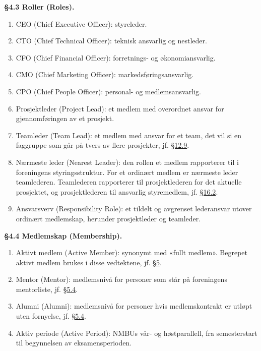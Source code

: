 \documentclass{../../../Common/Latex/Templates/rapport}
\begin{document}
\textbf{\S 4.3 Roller (Roles).}\label{bylaw:4.3}
\begin{enumerate}
  \item CEO (Chief Executive Officer): styreleder.
  \item CTO (Chief Technical Officer): teknisk ansvarlig og nestleder.
  \item CFO (Chief Financial Officer): forretnings- og økonomiansvarlig.
  \item CMO (Chief Marketing Officer): markedsføringsansvarlig.
  \item CPO (Chief People Officer): personal- og medlemsansvarlig.
  \item Prosjektleder (Project Lead): et medlem med overordnet ansvar for gjennomføringen av et prosjekt.
  \item Teamleder (Team Lead): et medlem med ansvar for et team, det vil si en faggruppe som går på tvers av flere prosjekter, jf. \hyperref[bylaw:12.9]{\S 12.9}.
  \item Nærmeste leder (Nearest Leader): den rollen et medlem rapporterer til i foreningens styringsstruktur. For et ordinært medlem er nærmeste leder teamlederen. Teamlederen rapporterer til prosjektlederen for det aktuelle prosjektet, og prosjektlederen til ansvarlig styremedlem, jf. \hyperref[bylaw:16.2]{\S 16.2}.
  \item Ansvarsverv (Responsibility Role): et tildelt og avgrenset lederansvar utover ordinært medlemskap, herunder prosjektleder og teamleder.
\end{enumerate}

\textbf{\S 4.4 Medlemskap (Membership).}\label{bylaw:4.4}
\begin{enumerate}
  \item Aktivt medlem (Active Member): synonymt med «fullt medlem». Begrepet aktivt medlem brukes i disse vedtektene, jf. \hyperref[bylaw:5]{\S 5}.
  \item Mentor (Mentor): medlemsnivå for personer som står på foreningens mentorliste, jf. \hyperref[bylaw:5.4]{\S 5.4}.
  \item Alumni (Alumni): medlemsnivå for personer hvis medlemskontrakt er utløpt uten fornyelse, jf. \hyperref[bylaw:5.4]{\S 5.4}.
  \item Aktiv periode (Active Period): NMBUs vår- og høstparallell, fra semesterstart til begynnelsen av eksamensperioden.
\end{enumerate}
\end{document}
